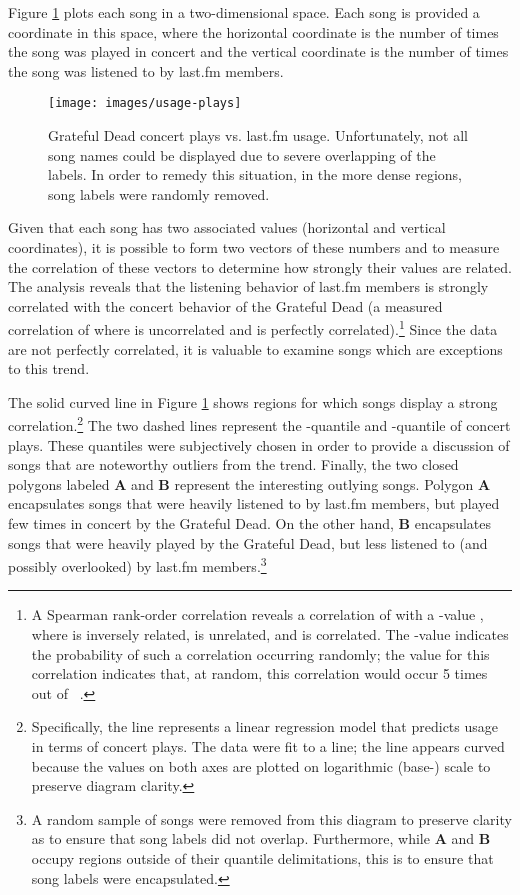 \documentclass{svmult}
\begin{document}
Figure \ref{fig:usage-plays} plots each song in a two-dimensional space. Each song is provided a coordinate in this space, where the horizontal coordinate is the number of times the song was played in concert and the vertical coordinate is the number of times the song was listened to by last.fm members.
\begin{figure}[ht]
\begin{center}
\texttt{[image: images/usage-plays]}
\caption{\label{fig:usage-plays}Grateful Dead concert plays vs. last.fm usage. Unfortunately, not all song names could be displayed due to severe overlapping of the labels. In order to remedy this situation, in the more dense regions, song labels were randomly removed.}
\end{center}
\end{figure}
Given that each song has two associated values (horizontal and vertical coordinates), it is possible to form two vectors of these numbers and to measure the correlation of these vectors to determine how strongly their values are related. The analysis reveals that the listening behavior of last.fm members is strongly correlated with the concert behavior of the Grateful Dead (a measured correlation of  where  is uncorrelated and  is perfectly correlated).\footnote{A Spearman  rank-order correlation reveals a correlation of  with a -value , where  is inversely related,  is unrelated, and  is correlated.  The -value indicates the probability of such a correlation occurring randomly; the  value for this correlation indicates that, at random, this correlation would occur 5 times out of ~\cite{parame:sheskin2004}.}  Since the data are not perfectly correlated, it is valuable to examine songs which are exceptions to this trend.

The solid curved line in Figure \ref{fig:usage-plays} shows regions for which songs display a strong correlation.\footnote{Specifically, the line represents a linear regression model that predicts usage in terms of concert plays. The data were fit to a line; the line appears curved because the values on both axes are plotted on logarithmic (base-) scale to preserve diagram clarity.} The two dashed lines represent the -quantile and -quantile of concert plays. These quantiles were subjectively chosen in order to provide a discussion of songs that are noteworthy outliers from the trend. Finally, the two closed polygons labeled {\bf A} and {\bf B} represent the interesting outlying songs. Polygon {\bf A} encapsulates songs that were heavily listened to by last.fm members, but played few times in concert by the Grateful Dead. On the other hand, {\bf B} encapsulates songs that were heavily played by the Grateful Dead, but less listened to (and possibly overlooked) by last.fm members.\footnote{A random sample of songs were removed from this diagram to preserve clarity as to ensure that song labels did not overlap. Furthermore, while {\bf A} and {\bf B} occupy regions outside of their quantile delimitations, this is to ensure that song labels were encapsulated.}
\end{document}
